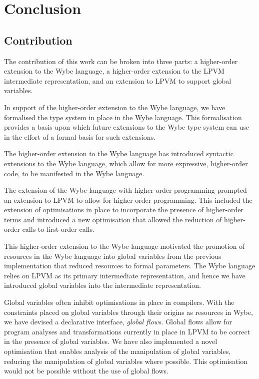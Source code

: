 \clearpage

\def\chaptertitle{Conclusion}

\lhead{\emph{\chaptertitle}}

\chapter{\chaptertitle}
\label{ch:conclusion}

\section{Contribution}
\label{sec:contribution}

The contribution of this work can be broken into three parts: a higher-order extension to the Wybe language, a higher-order extension to the LPVM intermediate representation, and an extension to LPVM to support global variables. 

In support of the higher-order extension to the Wybe language, we have formalised the type system in place in the Wybe language. This formalisation provides a basis upon which future extensions to the Wybe type system can use in the effort of a formal basis for such extensions.

The higher-order extension to the Wybe language has introduced syntactic extensions to the Wybe language, which allow for more expressive, higher-order code, to be manifested in the Wybe language. 

The extension of the Wybe language with higher-order programming prompted an extension to LPVM to allow for higher-order programming. This included the extension of optimisations in place to incorporate the presence of higher-order terms and introduced a new optimisation that allowed the reduction of higher-order calls to first-order calls.

This higher-order extension to the Wybe language motivated the promotion of resources in the Wybe language into global variables from the previous implementation that reduced resources to formal parameters. The Wybe language relies on LPVM as its primary intermediate representation, and hence we have introduced global variables into the intermediate representation.

Global variables often inhibit optimisations in place in compilers. With the constraints placed on global variables through their origins as resources in Wybe, we have devised a declarative interface, \textit{global flows}. Global flows allow for program analyses and transformations currently in place in LPVM to be correct in the presence of global variables. We have also implemented a novel optimisation that enables analysis of the manipulation of global variables, reducing the manipulation of global variables where possible. This optimisation would not be possible without the use of global flows.

